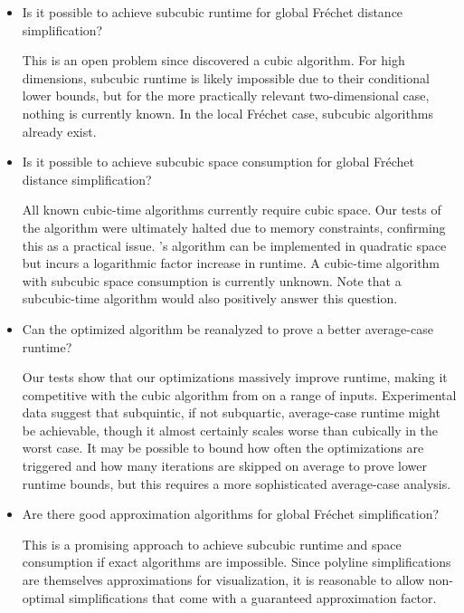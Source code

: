 \begin{itemize}
  \item Is it possible to achieve subcubic runtime for global Fréchet distance simplification?

	This is an open problem since \citeauthor{polyline_simplification_has_cubic_complexity_bringmannetal} discovered a cubic algorithm. For high dimensions, subcubic runtime is likely impossible due to their conditional lower bounds, but for the more practically relevant two-dimensional case, nothing is currently known. In the local Fréchet case, subcubic algorithms already exist.

	\item Is it possible to achieve subcubic space consumption for global Fréchet distance simplification?

	All known cubic-time algorithms currently require cubic space. Our tests of the \citeauthor{polyline_simplification_has_cubic_complexity_bringmannetal} algorithm were ultimately halted due to memory constraints, confirming this as a practical issue. \citeauthor{global_curve_simplification}'s algorithm can be implemented in quadratic space but incurs a logarithmic factor increase in runtime. A cubic-time algorithm with subcubic space consumption is currently unknown. Note that a subcubic-time algorithm would also positively answer this question.

	\item Can the optimized \citeauthor{on_optimal_polyline_simplification_using_the_hausdorff_and_frechet_distance} algorithm be reanalyzed to prove a better average-case runtime?

	Our tests show that our optimizations massively improve runtime, making it competitive with the cubic algorithm from \citeauthor{polyline_simplification_has_cubic_complexity_bringmannetal} on a range of inputs. Experimental data suggest that subquintic, if not subquartic, average-case runtime might be achievable, though it almost certainly scales worse than cubically in the worst case. It may be possible to bound how often the optimizations are triggered and how many iterations are skipped on average to prove lower runtime bounds, but this requires a more sophisticated average-case analysis.

	\item Are there good approximation algorithms for global Fréchet simplification?

	This is a promising approach to achieve subcubic runtime and space consumption if exact algorithms are impossible. Since polyline simplifications are themselves approximations for visualization, it is reasonable to allow non-optimal simplifications that come with a guaranteed approximation factor.


\end{itemize}
